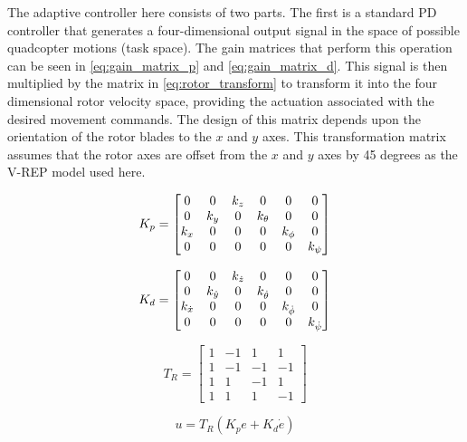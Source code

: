 \documentclass[letterpaper, 10 pt, conference]{ieeeconf}  %
\begin{document}
The adaptive controller here consists of two parts. The first is a standard PD controller that generates a four-dimensional output signal in the space of possible quadcopter motions (task space). 
The gain matrices that perform this operation can be seen in \eqref{eq:gain_matrix_p} and \eqref{eq:gain_matrix_d}. 
This signal is then multiplied by the matrix in \eqref{eq:rotor_transform} to transform it into the four dimensional rotor velocity space, providing the actuation associated with the desired movement commands.
The design of this matrix depends upon the orientation of the rotor blades to the $x$ and $y$ axes. 
This transformation matrix assumes that the rotor axes are offset from the $x$ and $y$ axes by 45 degrees as the V-REP model used here.

\begin{equation} \label{eq:gain_matrix_p}
K_{p} =
\setcounter{MaxMatrixCols}{12}
\begin{bmatrix}
0 & 0 & k_{z} & 0 & 0 & 0 \\
0 & k_{y} & 0 & k_{\theta} & 0 & 0\\
k_{x} & 0 & 0 & 0 & k_{\phi} & 0 \\
0 & 0 & 0 & 0 & 0 & k_{\psi}
\end{bmatrix}
\end{equation}

\begin{equation} \label{eq:gain_matrix_d}
K_{d} =
\setcounter{MaxMatrixCols}{12}
\begin{bmatrix}
0 & 0 & k_{\dot{z}} & 0 & 0 & 0 \\
0 & k_{\dot{y}} & 0 & k_{\dot{\theta}} & 0 & 0\\
k_{\dot{x}} & 0 & 0 & 0 & k_{\dot{\phi}} & 0 \\
0 & 0 & 0 & 0 & 0 & k_{\dot{\psi}}
\end{bmatrix}
\end{equation}

\begin{equation} \label{eq:rotor_transform}
T_{R} = 
\begin{bmatrix}
1 & -1 & 1 & 1 \\
1 & -1 & -1 & -1 \\
1 & 1 & -1 & 1 \\
1 & 1 & 1 & -1
\end{bmatrix}
\end{equation}

\begin{equation} \label{eq:control_equation}
u = T_{R}(K_{p}e + K_{d}\dot{e})
\end{equation}
\end{document}

